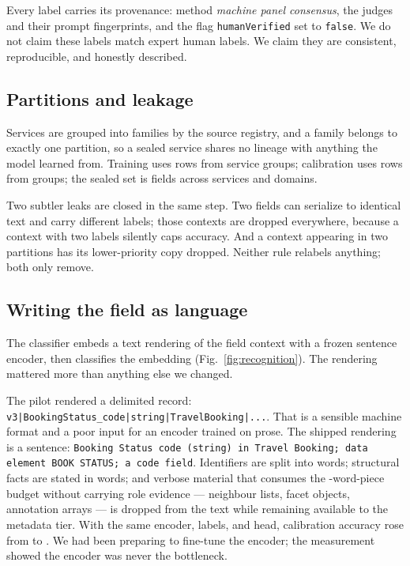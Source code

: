 \documentclass[journal]{IEEEtran}
\newcommand{\code}[1]{\texttt{#1}}
\begin{document}
Every label carries its provenance: method \emph{machine panel
consensus}, the judges and their prompt fingerprints, and the flag
\code{humanVerified} set to \code{false}. We do not claim these labels
match expert human labels. We claim they are consistent, reproducible,
and honestly described.

\subsection{Partitions and leakage}

Services are grouped into families by the source registry, and a family
belongs to exactly one partition, so a sealed service shares no lineage
with anything the model learned from. Training uses \TrainRows{} rows
from \TrainGroups{} service groups; calibration uses
\CalibrationRows{} rows from \CalibrationGroups{} groups; the sealed set
is \SealedRows{} fields across \SealedServices{} services and
\SealedDomains{} domains.

Two subtler leaks are closed in the same step. Two fields can serialize
to identical text and carry different labels; those contexts are dropped
everywhere, because a context with two labels silently caps accuracy.
And a context appearing in two partitions has its lower-priority copy
dropped. Neither rule relabels anything; both only remove.

\subsection{Writing the field as language}

The classifier embeds a text rendering of the field context with a
frozen sentence encoder, then classifies the embedding
(Fig.~\ref{fig:recognition}). The rendering mattered more than anything
else we changed.

The pilot rendered a delimited record:
\code{v3|BookingStatus\_code|string|TravelBooking|...}. That is a
sensible machine format and a poor input for an encoder trained on
prose. The shipped rendering is a sentence: \code{Booking Status code
(string) in Travel Booking; data element BOOK STATUS; a code field}.
Identifiers are split into words; structural facts are stated in words;
and verbose material that consumes the \TokenBudget{}-word-piece budget
without carrying role evidence --- neighbour lists, facet objects,
annotation arrays --- is dropped from the text while remaining available
to the metadata tier. With the same encoder, labels, and head,
calibration accuracy rose from \DelimitedAccuracy{} to
\SentenceAccuracy{}. We had been preparing to fine-tune the encoder; the
measurement showed the encoder was never the bottleneck.
\end{document}
